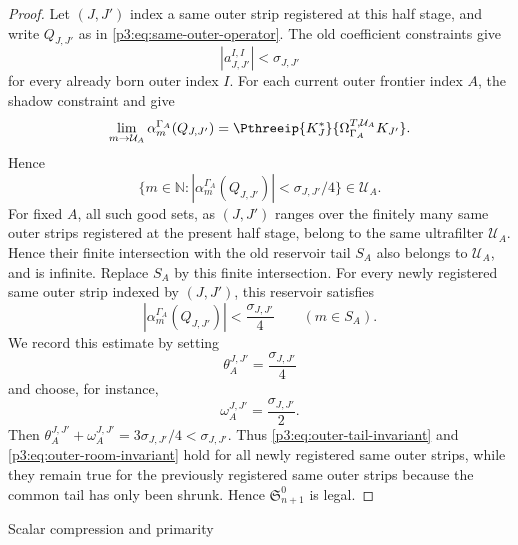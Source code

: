 \documentclass[11pt,reqno]{amsart}
\makeatletter
\theoremstyle{plain}
\theoremstyle{definition}
\newcounter{problempaper}
\newenvironment{problempaperbody}{%
  \setcounter{subsection}{0}%
  \setcounter{subsubsection}{0}%
  \setcounter{paragraph}{0}%
  \renewcommand{\thesubsection}{\arabic{subsection}}%
  \renewcommand{\thesubsubsection}{\thesubsection.\arabic{subsubsection}}%
  \renewcommand{\theparagraph}{\thesubsubsection.\arabic{paragraph}}%
  \let\problem@outersection\section
  \let\problem@outersubsection\subsection
  \let\problem@outersubsubsection\subsubsection
  \let\problem@outerparagraph\paragraph
  \let\section\problem@papersection
  \let\subsection\problem@papersubsection
  \let\subsubsection\problem@papersubsubsection
}{%
  \let\section\problem@outersection
  \let\subsection\problem@outersubsection
  \let\subsubsection\problem@outersubsubsection
  \let\paragraph\problem@outerparagraph
}
\newcommand{\problem@target}[2]{%
  \hypertarget{problem-\theproblempaper-#1-#2}{}%
}
\newcommand{\problem@paperheading}[3]{%
  \par\bigskip
  \problem@target{#1}{#2}%
  \noindent{\large\bfseries #2.\quad #3\par}%
  \nobreak\smallskip
}
\newcommand{\problem@papersubheading}[3]{%
  \par\medskip
  \problem@target{#1}{#2}%
  \noindent{\normalsize\bfseries #2.\quad #3\par}%
  \nobreak\smallskip
}
\newcommand{\problem@papersubsubheading}[3]{%
  \par\smallskip
  \problem@target{#1}{#2}%
  \noindent{\normalsize\itshape #2.\quad #3.\ }%
}
\def\problem@papersection{%
  \@ifstar{\problem@papersectionstar}{\problem@papersectionnostar}%
}
\def\problem@papersectionstar#1{%
  \par\bigskip\noindent{\large\bfseries #1\par}\nobreak\smallskip
}
\def\problem@papersectionnostar#1{%
  \refstepcounter{subsection}%
  \setcounter{subsubsection}{0}%
  \setcounter{paragraph}{0}%
  \problem@paperheading{section}{\thesubsection}{#1}%
  \problem@writecontentsline{section}{\thesubsection}{#1}%
}
\def\problem@papersubsection{%
  \@ifstar{\problem@papersubsectionstar}{\problem@papersubsectionnostar}%
}
\def\problem@papersubsectionstar#1{%
  \par\medskip\noindent{\normalsize\bfseries #1\par}\nobreak\smallskip
}
\def\problem@papersubsectionnostar#1{%
  \refstepcounter{subsubsection}%
  \setcounter{paragraph}{0}%
  \problem@papersubheading{subsection}{\thesubsubsection}{#1}%
  \problem@writecontentsline{subsection}{\thesubsubsection}{#1}%
}
\def\problem@papersubsubsection{%
  \@ifstar{\problem@papersubsubsectionstar}{\problem@papersubsubsectionnostar}%
}
\def\problem@papersubsubsectionstar#1{%
  \par\smallskip\noindent{\normalsize\itshape #1.\ }%
}
\def\problem@papersubsubsectionnostar#1{%
  \refstepcounter{paragraph}%
  \problem@papersubsubheading{subsubsection}{\theparagraph}{#1}%
  \problem@writecontentsline{subsubsection}{\theparagraph}{#1}%
}
\newcommand{\problem@writecontentsline}[3]{%
  \begingroup
  \protected@write\@auxout{}{%
    \string\problemcontentsentry{\theproblempaper}{#1}{#2}{#3}{\thepage}%
  }%
  \endgroup
}
\newcommand{\problemcontentsentry}[5]{%
  \@ifundefined{problemcontents@#1}{%
    \expandafter\gdef\csname problemcontents@#1\endcsname{}%
  }{}%
  \expandafter\g@addto@macro\csname problemcontents@#1\endcsname{%
    \problemcontentsline{#1}{#2}{#3}{#4}{#5}%
  }%
}
\newcommand{\problemcontentslink}[4]{%
  \hyperlink{problem-#1-#2-#3}{#4}%
}
\newcommand{\problemcontentsline}[5]{%
  \ifstrequal{#2}{section}{%
    \par\noindent
    \problemcontentslink{#1}{#2}{#3}{\makebox[2.5em][l]{#3}#4}%
    \nobreak\dotfill
    \problemcontentslink{#1}{#2}{#3}{#5}\par
  }{%
    \ifstrequal{#2}{subsection}{%
      \par\noindent\hspace*{1.5em}%
      \problemcontentslink{#1}{#2}{#3}{\makebox[3.5em][l]{#3}#4}%
      \nobreak\dotfill
      \problemcontentslink{#1}{#2}{#3}{#5}\par
    }{%
      \par\noindent\hspace*{3em}%
      \problemcontentslink{#1}{#2}{#3}{\makebox[4.5em][l]{#3}#4}%
      \nobreak\dotfill
      \problemcontentslink{#1}{#2}{#3}{#5}\par
    }%
  }%
}
\makeatother
\begin{document}
\begin{problempaperbody}
\begin{proof}
Let $(J,J')$ index a same outer strip registered at this half stage, and write $Q_{J,J'}$ as in \eqref{p3:eq:same-outer-operator}. The old coefficient constraints give
\begin{equation*}
        |a_{J,J'}^{I,I}|<\sigma_{J,J'}
\end{equation*}
for every already born outer index $I$. For each current outer frontier index $A$, the shadow constraint and  give
\begin{equation*}
        \lim_{m\to\mathcal U_A}\alpha_m^{\Gamma_A}(Q_{J,J'})=\Pthreeip{K_J^*}{\Omega_{\Gamma_A}^{T,\mathcal U_A}K_{J'}}.
\end{equation*}
Hence
\begin{equation*}
        \{m\in\mathbb N:|\alpha_m^{\Gamma_A}(Q_{J,J'})|<\sigma_{J,J'}/4\}\in\mathcal U_A.
\end{equation*}
For fixed $A$, all such good sets, as $(J,J')$ ranges over the finitely many same outer strips registered at the present half stage, belong to the same ultrafilter $\mathcal U_A$. Hence their finite intersection with the old reservoir tail $S_A$ also belongs to $\mathcal U_A$, and is infinite. Replace $S_A$ by this finite intersection. For every newly registered same outer strip indexed by $(J,J')$, this reservoir satisfies
\begin{equation*}
        |\alpha_m^{\Gamma_A}(Q_{J,J'})|<\frac{\sigma_{J,J'}}{4}\qquad(m\in S_A).
\end{equation*}
We record this estimate by setting
\begin{equation*}
        \theta_A^{J,J'}=\frac{\sigma_{J,J'}}{4}
\end{equation*}
and choose, for instance,
\begin{equation*}
        \omega_A^{J,J'}=\frac{\sigma_{J,J'}}{2}.
\end{equation*}
Then $\theta_A^{J,J'}+\omega_A^{J,J'}=3\sigma_{J,J'}/4<\sigma_{J,J'}$. Thus \eqref{p3:eq:outer-tail-invariant} and \eqref{p3:eq:outer-room-invariant} hold for all newly registered same outer strips, while they remain true for the previously registered same outer strips because the common tail has only been shrunk. Hence $\mathfrak S_{n+1}^0$ is legal.
\end{proof}


\section{Scalar compression and primarity}
\label{p3:sec:scalar-compression}


\end{problempaperbody}
\end{document}
